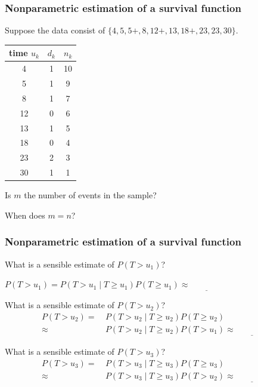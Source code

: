 \documentclass[12pt, 
hyperref={colorlinks=true, linkcolor=blue, urlcolor=cyan},dvipsnames]{beamer}
\begin{document}
\begin{frame}
\frametitle{Nonparametric estimation of a survival function}

{\small Suppose the data consist of $\{4, 5, 5+, 8, 12+, 13, 18+, 23, 23, 30\}$.}

\begin{center}
\begin{tabular}{|c|c|c|}
\hline
time $u_k$ & $d_k$ & $n_k$ \\
\hline
4 & 1 & 10 \\
5 & 1 & 9 \\
8 & 1 & 7 \\
12 & 0 & 6 \\
13 & 1 & 5 \\
18 & 0 & 4 \\
23 & 2 & 3 \\
30 & 1 & 1 \\
\hline
\end{tabular}
\end{center}

Is $m$ the number of events in the sample? \underline{\;\;\phantom{right}\;\;}

When does $m = n$? \underline{\;\;\phantom{right}\;\;}
\end{frame}

\begin{frame}
\frametitle{Nonparametric estimation of a survival function}

What is a sensible estimate of $P(T > u_1)$?

$P(T > u_1) = P(T > u_1 \mid T \geq u_1)P(T \geq u_1) \approx \underline{\;\;\;\phantom{right}\;\;\;}$ \pause

What is a sensible estimate of $P(T > u_2)$?
\begin{align*}
P(T > u_2) =& \ P(T > u_2 \mid T \geq u_2)P(T \geq u_2) \\
\approx &\ P(T > u_2 \mid T \geq u_2)P(T > u_1) \approx \underline{\;\;\;\phantom{right}\;\;\;}
\end{align*} \pause

What is a sensible estimate of $P(T > u_3)$? \pause
\begin{align*}
P(T > u_3) =& \ P(T > u_3 \mid T \geq u_3)P(T \geq u_3) \\
\approx &\ P(T > u_3 \mid T \geq u_3)P(T > u_2) \approx \underline{\;\;\;\phantom{right}\;\;\;}
\end{align*}

\end{frame}
\end{document}
